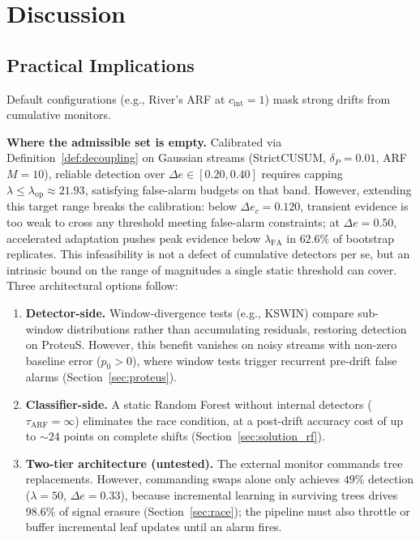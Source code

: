 \documentclass[10pt,conference]{IEEEtran}
\theoremstyle{definition}
\begin{document}
\section{Discussion}\label{sec:discussion}

\subsection{Practical Implications}
Default configurations (e.g., River's ARF at $c_{\mathrm{int}} = 1$) mask strong drifts from cumulative monitors.

\textbf{Where the admissible set is empty.} Calibrated via Definition~\ref{def:decoupling} on Gaussian streams (StrictCUSUM, $\delta_P = 0.01$, ARF $M=10$), reliable detection over $\Delta e \in [0.20, 0.40]$ requires capping $\lambda \le \lambda_{\mathrm{op}} \approx 21.93$, satisfying false-alarm budgets on that band. However, extending this target range breaks the calibration: below $\Delta e_c = 0.120$, transient evidence is too weak to cross any threshold meeting false-alarm constraints; at $\Delta e = 0.50$, accelerated adaptation pushes peak evidence below $\lambda_{\mathrm{FA}}$ in $62.6\%$ of bootstrap replicates. This infeasibility is not a defect of cumulative detectors per se, but an intrinsic bound on the range of magnitudes a single static threshold can cover.
Three architectural options follow:
\begin{enumerate}[nosep, leftmargin=*, label=\textbf{(S\arabic*)}]
  \item \textbf{Detector-side.} Window-divergence tests (e.g., KSWIN) compare sub-window distributions rather than accumulating residuals, restoring detection on ProteuS. However, this benefit vanishes on noisy streams with non-zero baseline error ($p_0 > 0$), where window tests trigger recurrent pre-drift false alarms (Section~\ref{sec:proteus}).
  \item \textbf{Classifier-side.} A static Random Forest without internal detectors ($\tau_{\mathrm{ARF}} = \infty$) eliminates the race condition, at a post-drift accuracy cost of up to ${\sim}24$ points on complete shifts (Section~\ref{sec:solution_rf}).
  \item \textbf{Two-tier architecture (untested).} The external monitor commands tree replacements. However, commanding swaps alone only achieves $49\%$ detection ($\lambda = 50$, $\Delta e = 0.33$), because incremental learning in surviving trees drives $98.6\%$ of signal erasure (Section~\ref{sec:race}); the pipeline must also throttle or buffer incremental leaf updates until an alarm fires.
\end{enumerate}
\end{document}
